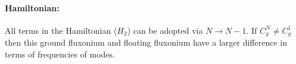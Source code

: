 \documentclass[prx,showpacs,notitlepage,twocolumn,superscriptaddress,nofootinbib,preprintnumbers,floatfix]{revtex4-2}
\begin{document}
\paragraph{Hamiltonian:} All terms in the Hamiltonian ($H_2$) can be adopted via $N\rightarrow N-1$. If $C_g^N\neq C_g^1$ then this ground fluxonium and floating fluxonium have a larger difference in terms of frequencies of modes.
 
\end{document}
